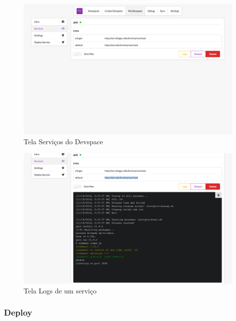 \begin{figure}[htb]
	\caption{\label{fig_frontend_devspace_services}Tela Serviços do Devspace}
	\begin{center}
	\includegraphics[width=\textwidth,keepaspectratio]{pictures/frontend/frontend-devspace-services.png}
	\end{center}
\end{figure}

\begin{figure}[htb]
	\caption{\label{fig_frontend_logs}Tela Logs de um serviço}
	\begin{center}
	\includegraphics[width=\textwidth,keepaspectratio]{pictures/frontend/frontend-logs.png}
	\end{center}
\end{figure}

\subsubsection{Deploy}

